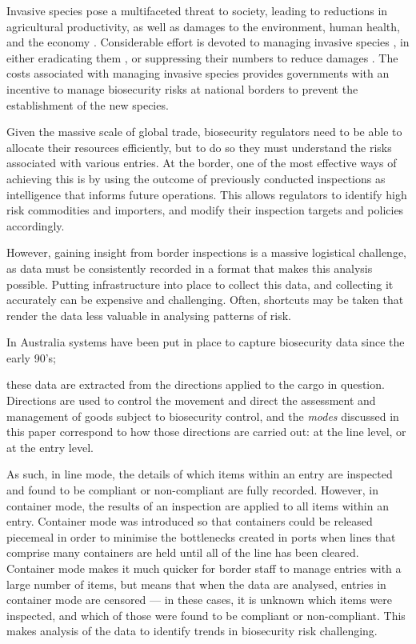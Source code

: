 \documentclass[useAMS,usenatbib,referee]{biom}
\newif\ifproofread
\newcommand{\rev}[1]{%
\ifproofread
\hl{#1}%
\else
#1%
\fi
}
\begin{document}
Invasive species pose a multifaceted threat to society, leading to reductions in agricultural productivity, as well as damages to the environment, human health, and the economy \citep{kumar_rai_invasive_2020}. Considerable effort is devoted to managing invasive species \citep{jardine_estimating_2018}, in either eradicating them \citep{baker_recent_2020,holmes_globally_2019, wenger_estimating_2017,helmstedt_prioritizing_2016}, or suppressing their numbers to reduce damages \citep{binny_long-term_2021,brook_effects_2012,sharov_slow_2002}. The costs associated with managing invasive species provides governments with an incentive to manage biosecurity risks at national borders to prevent the establishment of the new species. 

Given the massive scale of global trade, biosecurity regulators need to be able to allocate their resources efficiently, but to do so they must understand the risks associated with various entries. At the border, one of the most effective ways of achieving this is by using the outcome of previously conducted inspections as intelligence that informs future operations. This allows regulators to identify high risk commodities and importers, and modify their inspection targets and policies accordingly.

However, gaining insight from border inspections is a massive logistical challenge, as data must be consistently recorded in a format that makes this analysis possible. Putting infrastructure into place to collect this data, and collecting it accurately can be expensive and challenging. Often, shortcuts may be taken that render the data less valuable in analysing patterns of risk.

In Australia systems have been put in place to capture biosecurity data since the early 90's; \rev{these data are extracted from the directions applied to the cargo in question. Directions are used to control the movement and direct the assessment and management of goods subject to biosecurity control, and the \emph{modes} discussed in this paper correspond to how those directions are carried out: at the line level, or at the entry level.}  As such, in line mode, the details of which items within an entry are inspected and found to be compliant or non-compliant are fully recorded. However, in container mode, the results of an inspection are applied to all items within an entry. Container mode was introduced so that containers could be released piecemeal in order to minimise the bottlenecks created in ports when lines that comprise many containers are held until all of the line has been cleared. Container mode makes it much quicker for border staff to manage entries with a large number of items, but means that when the data are analysed, entries in container mode are censored --- in these cases, it is unknown which items were inspected, and which of those were found to be compliant or non-compliant. This makes analysis of the data to identify trends in biosecurity risk challenging. 
\end{document}
